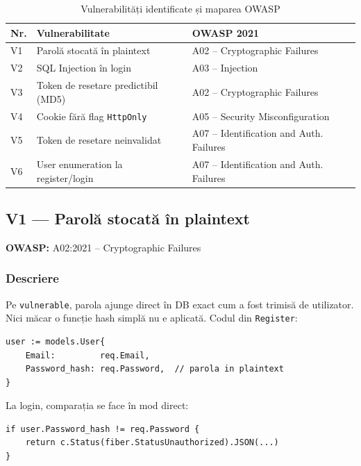 \documentclass[12pt]{article}
\begin{document}
\begin{table}[H]
\centering
\begin{tabular}{|l|l|l|}
\hline
\textbf{Nr.} & \textbf{Vulnerabilitate} & \textbf{OWASP 2021} \\
\hline
V1 & Parolă stocată în plaintext           & A02 -- Cryptographic Failures \\
V2 & SQL Injection în login                & A03 -- Injection \\
V3 & Token de resetare predictibil (MD5)   & A02 -- Cryptographic Failures \\
V4 & Cookie fără flag \texttt{HttpOnly}    & A05 -- Security Misconfiguration \\
V5 & Token de resetare neinvalidat         & A07 -- Identification and Auth. Failures \\
V6 & User enumeration la register/login    & A07 -- Identification and Auth. Failures \\
\hline
\end{tabular}
\caption{Vulnerabilități identificate și maparea OWASP}
\end{table}

\subsection{V1 --- Parolă stocată în plaintext}

\textbf{OWASP:} A02:2021 -- Cryptographic Failures

\subsubsection*{Descriere}

Pe \texttt{vulnerable}, parola ajunge direct în DB exact cum a fost trimisă de utilizator.
Nici măcar o funcție hash simplă nu e aplicată. Codul din \texttt{Register}:

\begin{verbatim}
user := models.User{
    Email:         req.Email,
    Password_hash: req.Password,  // parola in plaintext
}
\end{verbatim}

La login, comparația se face în mod direct:

\begin{verbatim}
if user.Password_hash != req.Password {
    return c.Status(fiber.StatusUnauthorized).JSON(...)
}
\end{verbatim}
\end{document}
